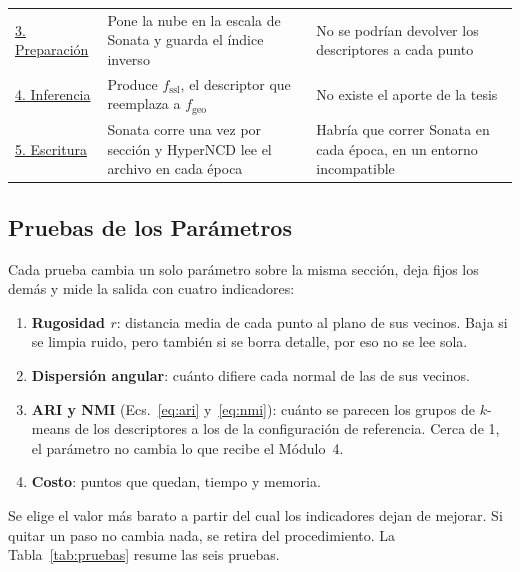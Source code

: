 \begin{table}[!htbp]
\begin{tabularx}{\linewidth}{@{}>{\raggedright\arraybackslash\hsize=0.6\hsize}X>{\raggedright\arraybackslash\hsize=1.2\hsize}X>{\raggedright\arraybackslash\hsize=1.2\hsize}X@{}}
\hyperref[sec:u2-p3]{3. Preparación} & Pone la nube en la escala de Sonata y guarda el índice inverso & No se podrían devolver los descriptores a cada punto \\
\hyperref[sec:u2-p4]{4. Inferencia} & Produce $f_{\mathrm{ssl}}$, el descriptor que reemplaza a $f_{\mathrm{geo}}$ & No existe el aporte de la tesis \\
\hyperref[sec:u2-p5]{5. Escritura} & Sonata corre una vez por sección y HyperNCD lee el archivo en cada época & Habría que correr Sonata en cada época, en un entorno incompatible \\
\bottomrule
\end{tabularx}
\end{table}

\FloatBarrier
\subsection{Pruebas de los Parámetros}
\label{sec:param-criterio}
\label{sec:param-p0}\label{sec:param-p1}%
\label{sec:param-p2}\label{sec:param-p3}%
\label{sec:param-p4}\label{sec:param-p5}%

Cada prueba cambia un solo parámetro sobre la misma sección, deja fijos los
demás y mide la salida con cuatro indicadores:
\begin{enumerate}
\item \textbf{Rugosidad $r$}: distancia media de cada punto al plano de sus
vecinos. Baja si se limpia ruido, pero también si se borra detalle, por eso no
se lee sola.
\item \textbf{Dispersión angular}: cuánto difiere cada normal de las de sus
vecinos.
\item \textbf{ARI y NMI} (Ecs.~\eqref{eq:ari} y~\eqref{eq:nmi}): cuánto se
parecen los grupos de $k$-means de los descriptores a los de la configuración
de referencia. Cerca de 1, el parámetro no cambia lo que recibe el Módulo~4.
\item \textbf{Costo}: puntos que quedan, tiempo y memoria.
\end{enumerate}
Se elige el valor más barato a partir del cual los indicadores dejan de mejorar.
Si quitar un paso no cambia nada, se retira del procedimiento. La
Tabla~\ref{tab:pruebas} resume las seis pruebas.

